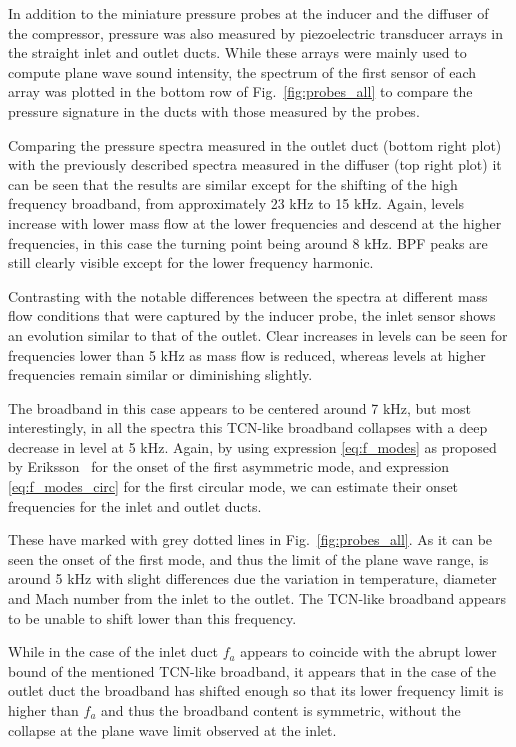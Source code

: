 In addition to the miniature pressure probes at the inducer and the diffuser of the compressor, pressure was also measured by piezoelectric transducer arrays in the straight inlet and outlet ducts. While these arrays were mainly used to compute plane wave sound intensity, the spectrum of the first sensor of each array was plotted in the bottom row of Fig.~\ref{fig:probes_all} to compare the pressure signature in the ducts with those measured by the  probes.

Comparing the pressure spectra measured in the outlet duct (bottom right plot) with the previously described spectra measured in the diffuser (top right plot) it can be seen that the results are similar except for the shifting of the high frequency broadband, from approximately 23 kHz to 15 kHz. Again, levels increase with lower mass flow at the lower frequencies and descend at the higher frequencies, in this case the turning point being around 8 kHz. BPF peaks are still clearly visible except for the lower frequency harmonic.

Contrasting with the notable differences between the spectra at different  mass flow conditions that were captured by the inducer probe, the inlet sensor shows an evolution similar to that of the outlet. Clear increases in levels can be seen for frequencies lower than 5 kHz as mass flow is reduced, whereas levels at higher frequencies remain similar or diminishing slightly.

The broadband in this case appears to be centered around 7 kHz, but most interestingly, in all the spectra this TCN-like broadband collapses with a deep decrease in level at 5 kHz. Again, by using expression \ref{eq:f_modes} as proposed by Eriksson~\cite{eriksson1980higher} for the onset of the first asymmetric mode, and  expression \ref{eq:f_modes_circ} for the first circular mode, we can estimate their onset frequencies for the inlet and outlet ducts. 

These have marked with grey dotted lines in Fig.~\ref{fig:probes_all}. As it can be seen the onset of the first mode, and thus the limit of the plane wave range, is around 5 kHz with slight differences due the variation in temperature, diameter and Mach number from the inlet to the outlet. The TCN-like broadband appears to be unable to shift lower than this frequency.

While in the case of the inlet duct $f_a$ appears to coincide with the abrupt lower bound of the mentioned TCN-like broadband, it appears that in the case of the outlet duct the broadband has shifted enough so that its lower frequency limit is higher than $f_a$ and thus the broadband content is symmetric, without the collapse at the plane wave limit observed at the inlet.


